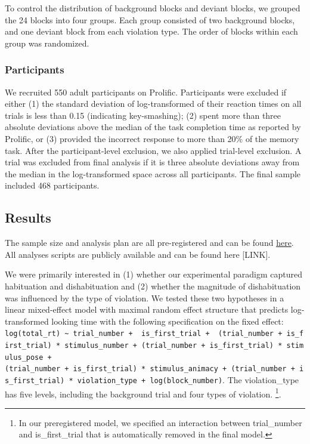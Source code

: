 \documentclass[10pt, letterpaper]{article}
\begin{document}
To control the distribution of background blocks and deviant blocks, we
grouped the 24 blocks into four groups. Each group consisted of two
background blocks, and one deviant block from each violation type. The
order of blocks within each group was randomized.

\hypertarget{participants}{%
\subsubsection{Participants}\label{participants}}

We recruited 550 adult participants on Prolific. Participants were
excluded if either (1) the standard deviation of log-transformed of
their reaction times on all trials is less than 0.15 (indicating
key-smashing); (2) spent more than three absolute deviations above the
median of the task completion time as reported by Prolific, or (3)
provided the incorrect response to more than 20\% of the memory task.
After the participant-level exclusion, we also applied trial-level
exclusion. A trial was excluded from final analysis if it is three
absolute deviations away from the median in the log-transformed space
across all participants. The final sample included 468 participants.

\hypertarget{results}{%
\subsection{Results}\label{results}}

The sample size and analysis plan are all pre-registered and can be
found \href{https://aspredicted.org/blind.php?x=WGF_J7K}{here}. All
analyses scripts are publicly available and can be found here
{[}LINK{]}.

We were primarily interested in (1) whether our experimental paradigm
captured habituation and dishabituation and (2) whether the magnitude of
dishabituation was influenced by the type of violation. We tested these
two hypotheses in a linear mixed-effect model with maximal random effect
structure that predicts log-transformed looking time with the following
specification on the fixed effect:
\texttt{log(total\_rt)\ \textasciitilde{}\ trial\_number\ +\ \ is\_first\_trial\ +\ \ (trial\_number\ +\ is\_first\_trial)\ *\ stimulus\_number\ +\ (trial\_number\ +\ is\_first\_trial)\ *\ stimulus\_pose\ +(trial\_number\ +\ is\_first\_trial)\ *\ stimulus\_animacy\ +\ (trial\_number\ +\ is\_first\_trial)\ *\ violation\_type\ +\ log(block\_number)}.
The violation\_type has five levels, including the background trial and
four types of violation. \footnote{In our preregistered model, we
  specified an interaction between trial\_number and is\_first\_trial
  that is automatically removed in the final model.}.
\end{document}
